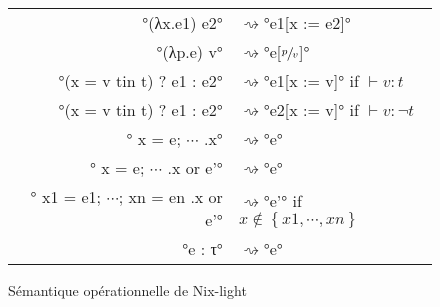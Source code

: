 \begin{figure}
  \center
  \def\leadsto{\ensuremath{\rightsquigarrow}}
  \begin{tabular}{rl}
  °(λx.e1) e2° &\leadsto °e1[x := e2]° \\
  °(λp.e) v° &\leadsto °e[$\sfrac{p}{v}$]° \\
  °(x = v tin t) ? e1 : e2° &\leadsto °e1[x := v]° \quad if $\vdash v : t$ \\
  °(x = v tin t) ? e1 : e2° &\leadsto °e2[x := v]° \quad if $\vdash v : \lnot t$ \\
  °{ x = e; $\cdots$ }.x° &\leadsto °e° \\
  °{ x = e; $\cdots$ }.x or e'° &\leadsto °e° \\
  °{ x1 = e1; $\cdots$; xn = en }.x or e'° &\leadsto °e'°
      \quad if $x \notin \left\{ x1, \cdots, xn \right\}$ \\
  °e : τ° &\leadsto °e°
  \end{tabular}
  \caption{Sémantique opérationnelle de Nix-light\label{nix-light::semantics}}
\end{figure}
